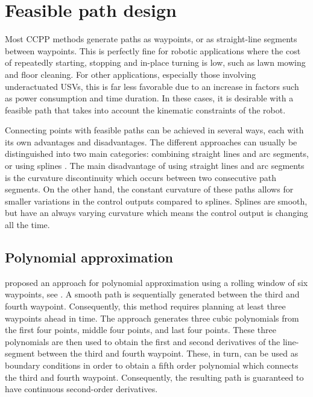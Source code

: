 \section{Feasible path design}

Most CCPP methods generate paths as waypoints, or as straight-line segments between waypoints. This is perfectly fine for robotic applications where the cost of repeatedly starting, stopping and in-place turning is low, such as lawn mowing and floor cleaning. For other applications, especially those involving underactuated USVs, this is far less favorable due to an increase in factors such as power consumption and time duration. In these cases, it is desirable with a feasible path that takes into account the kinematic constraints of the robot.

Connecting points with feasible paths can be achieved in several ways, each with its own advantages and disadvantages. The different approaches can usually be distinguished into two main categories: combining straight lines and arc segments, or using splines \citep{lekkas2014guidance}. %
The main disadvantage of using straight lines and arc segments is the curvature discontinuity which occurs between two consecutive path segments. On the other hand, the constant curvature of these paths allows for smaller variations in the control outputs compared to splines. Splines are smooth, but have an always varying curvature which means the control output is changing all the time.


\subsection{Polynomial approximation}

\citet{guo2006complete} proposed an approach for polynomial approximation using a rolling window of six waypoints, see . A smooth path is sequentially generated between the third and fourth waypoint. Consequently, this method requires planning at least three waypoints ahead in time. The approach generates three cubic polynomials from the first four points, middle four points, and last four points. These three polynomials are then used to obtain the first and second derivatives of the line-segment between the third and fourth waypoint. These, in turn, can be used as boundary conditions in order to obtain a fifth order polynomial which connects the third and fourth waypoint. Consequently, the resulting path is guaranteed to have continuous second-order derivatives.

